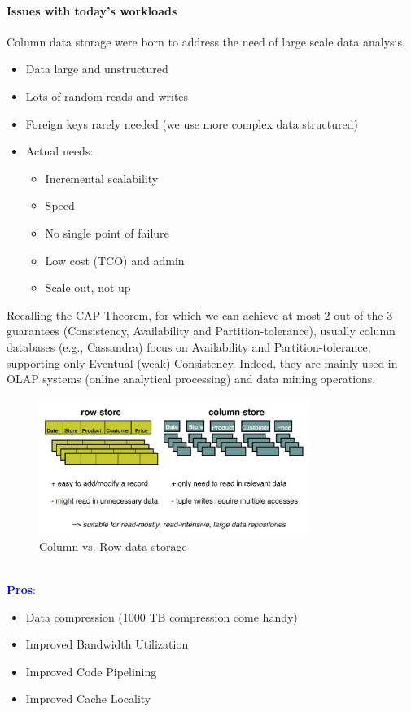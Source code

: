 \documentclass[10pt,a4paper]{article}
\begin{document}
\paragraph{Issues with today's workloads}
Column data storage were born to address the need of large scale data analysis.
\begin{itemize}
	\item Data large and unstructured
	\item Lots of random reads and writes
	\item Foreign keys rarely needed (we use more complex data structured)
	\item Actual needs:
	\begin{itemize}
		\item Incremental scalability
		\item Speed
		\item No single point of failure
		\item Low cost (TCO) and admin
		\item Scale out, not up
	\end{itemize}
\end{itemize}
Recalling the CAP Theorem, for which we can achieve at most 2 out of the 3 guarantees (Consistency, Availability and Partition-tolerance), usually column databases (e.g., Cassandra) focus on Availability and Partition-tolerance, supporting only Eventual (weak) Consistency. Indeed, they are mainly used in OLAP systems (online analytical processing) and data mining operations.
\begin{figure}[h!]
 \hfill \includegraphics[width=250pt]{images/column-vs-row.png}\hspace*{\fill}
 \caption{Column vs. Row data storage}
\end{figure} \\
\textcolor{blue}{\textbf{Pros}}:
\begin{itemize}
	\item Data compression (1000 TB compression come handy)
	\item Improved Bandwidth Utilization
	\item Improved Code Pipelining
	\item Improved Cache Locality
\end{itemize}
\end{document}
